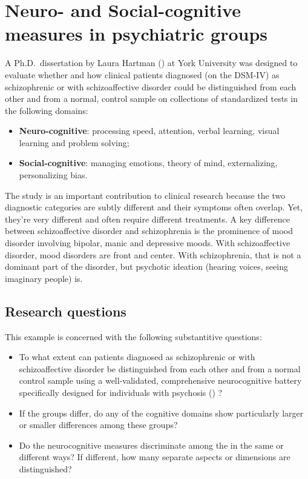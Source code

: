 \documentclass[
  letterpaper,
  10pt,
  krantz2]{krantz}
\begin{document}
\section{Neuro- and Social-cognitive measures in psychiatric
groups}\label{neuro--and-social-cognitive-measures-in-psychiatric-groups}

A Ph.D.~dissertation by Laura Hartman
() at York University was designed to
evaluate whether and how clinical patients diagnosed (on the DSM-IV) as
schizophrenic or with schizoaffective disorder could be distinguished
from each other and from a normal, control sample on collections of
standardized tests in the following domains:

\begin{itemize}
\item
  \textbf{Neuro-cognitive}: processing speed, attention, verbal
  learning, visual learning and problem solving;
\item
  \textbf{Social-cognitive}: managing emotions, theory of mind,
  externalizing, personalizing bias.
\end{itemize}

The study is an important contribution to clinical research because the
two diagnostic categories are subtly different and their symptoms often
overlap. Yet, they're very different and often require different
treatments. A key difference between schizoaffective disorder and
schizophrenia is the prominence of mood disorder involving bipolar,
manic and depressive moods. With schizoaffective disorder, mood
disorders are front and center. With schizophrenia, that is not a
dominant part of the disorder, but psychotic ideation (hearing voices,
seeing imaginary people) is.

\subsection{Research questions}\label{research-questions}

This example is concerned with the following substantitive questions:

\begin{itemize}
\item
  To what extent can patients diagnosed as schizophrenic or with
  schizoaffective disorder be distinguished from each other and from a
  normal control sample using a well-validated, comprehensive
  neurocognitive battery specifically designed for individuals with
  psychosis ()
  ?
\item
  If the groups differ, do any of the cognitive domains show
  particularly larger or smaller differences among these groups?
\item
  Do the neurocognitive measures discriminate among the in the same or
  different ways? If different, how many separate aspects or dimensions
  are distinguished?
\end{itemize}
\end{document}
